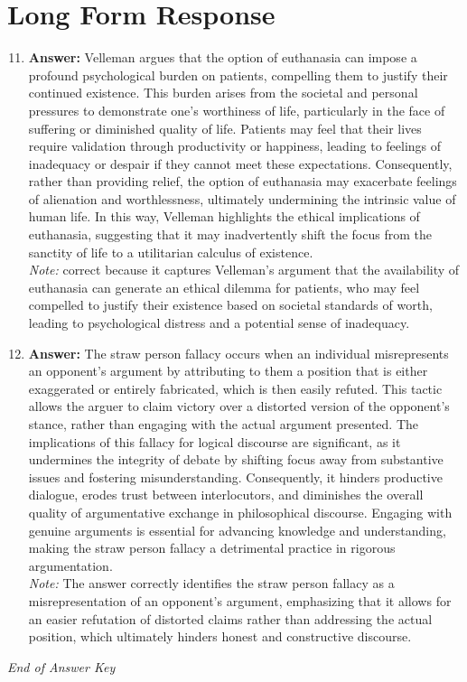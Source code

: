 \documentclass[12pt]{article}
\begin{document}
\section*{Long Form Response}
\begin{enumerate}[label=\arabic*.]
\setcounter{enumi}{10}
\item \textbf{Answer:} Velleman argues that the option of euthanasia can impose a profound psychological burden on patients, compelling them to justify their continued existence. This burden arises from the societal and personal pressures to demonstrate one's worthiness of life, particularly in the face of suffering or diminished quality of life. Patients may feel that their lives require validation through productivity or happiness, leading to feelings of inadequacy or despair if they cannot meet these expectations. Consequently, rather than providing relief, the option of euthanasia may exacerbate feelings of alienation and worthlessness, ultimately undermining the intrinsic value of human life. In this way, Velleman highlights the ethical implications of euthanasia, suggesting that it may inadvertently shift the focus from the sanctity of life to a utilitarian calculus of existence.
\\ \textit{Note:} correct because it captures Velleman's argument that the availability of euthanasia can generate an ethical dilemma for patients, who may feel compelled to justify their existence based on societal standards of worth, leading to psychological distress and a potential sense of inadequacy.
\item \textbf{Answer:} The straw person fallacy occurs when an individual misrepresents an opponent's argument by attributing to them a position that is either exaggerated or entirely fabricated, which is then easily refuted. This tactic allows the arguer to claim victory over a distorted version of the opponent's stance, rather than engaging with the actual argument presented. The implications of this fallacy for logical discourse are significant, as it undermines the integrity of debate by shifting focus away from substantive issues and fostering misunderstanding. Consequently, it hinders productive dialogue, erodes trust between interlocutors, and diminishes the overall quality of argumentative exchange in philosophical discourse. Engaging with genuine arguments is essential for advancing knowledge and understanding, making the straw person fallacy a detrimental practice in rigorous argumentation.
\\ \textit{Note:} The answer correctly identifies the straw person fallacy as a misrepresentation of an opponent's argument, emphasizing that it allows for an easier refutation of distorted claims rather than addressing the actual position, which ultimately hinders honest and constructive discourse.
\end{enumerate}

\vfill
\noindent\textit{End of Answer Key}
\end{document}
